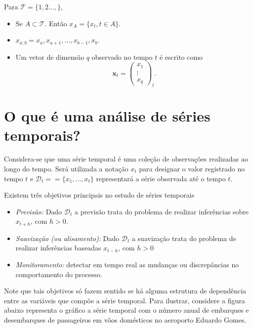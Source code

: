 \documentclass[
  letterpaper,
  DIV=11,
  numbers=noendperiod]{scrreprt}
\providecommand{\tightlist}{%
  \setlength{\itemsep}{0pt}\setlength{\parskip}{0pt}}\usepackage{longtable,booktabs,array}
\theoremstyle{plain}
\theoremstyle{definition}
\theoremstyle{definition}
\theoremstyle{remark}
\begin{document}
Para \(\mathcal{T}=\{1,2\ldots,\}\),

\begin{itemize}
\tightlist
\item
  Se \(A\subset\mathcal{T}\). Então \(x_A=\{x_{t},t\in A\}\).
\item
  \(x_{a:b}=x_a,x_{a+1},\ldots,x_{b-1},x_{b}.\)
\item
  Um vetor de dimensão \(q\) observado no tempo \(t\) é escrito como
  \[\boldsymbol{x}_t =\left(\begin{array}{c}x_{1} \\ \vdots \\ x_{q}\end{array}\right)_{t}.\]
\end{itemize}

\hypertarget{o-que-uxe9-uma-anuxe1lise-de-suxe9ries-temporais}{%
\section{O que é uma análise de séries
temporais?}\label{o-que-uxe9-uma-anuxe1lise-de-suxe9ries-temporais}}

Considera-se que uma série temporal é uma coleção de observações
realizadas ao longo do tempo. Será utilizada a notação \(x_t\) para
designar o valor registrado no tempo \(t\) e
\(\mathcal{D}_t==\{x_1,\ldots,x_t\}\) representará a série observada até
o tempo \(t\).

Existem três objetivos principais no estudo de séries temporais

\begin{itemize}
\item
  \emph{Previsão:} Dado \(\mathcal{D}_t\) a previsão trata do problema
  de realizar inferências sobre \(x_{t+h}\), com \(h>0\).
\item
  \emph{Suavização (ou alisamento):} Dado \(\mathcal{D}_t\) a suavização
  trata do problema de realizar inferências baseadas \(x_{t-h}\), com
  \(h>0\)
\item
  \emph{Monitoramento:} detectar em tempo real as mudanças ou
  discrepâncias no comportamento do processo.
\end{itemize}

Note que tais objetivos só fazem sentido se há alguma estrutura de
dependência entre as variáveis que compõe a série temporal. Para
ilustrar, considere a figura abaixo representa o gráfico a série
temporal com o número anual de embarques e desembarques de passageiros
em vôos domésticos no aeroporto Eduardo Gomes.
\end{document}
